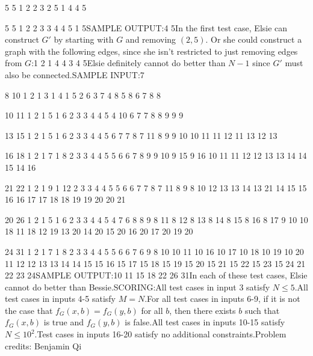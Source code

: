 \documentclass[12pt]{article}
\begin{document}
5 5
1 2
2 3
2 5
1 4
4 5

5 5
1 2
2 3
3 4
4 5
1 5SAMPLE OUTPUT:4
5In the first test case, Elsie can construct $G'$ by starting with $G$ and
removing  $(2,5)$. Or she could construct a graph with the following edges,
since she isn't restricted to just removing edges from $G$:1 2
1 4
4 3
4 5Elsie definitely cannot do better than $N-1$ since $G'$ must also be connected.SAMPLE INPUT:7

8 10
1 2
1 3
1 4
1 5
2 6
3 7
4 8
5 8
6 7
8 8

10 11
1 2
1 5
1 6
2 3
3 4
4 5
4 10
6 7
7 8
8 9
9 9

13 15
1 2
1 5
1 6
2 3
3 4
4 5
6 7
7 8
7 11
8 9
9 10
10 11
11 12
11 13
12 13

16 18
1 2
1 7
1 8
2 3
3 4
4 5
5 6
6 7
8 9
9 10
9 15
9 16
10 11
11 12
12 13
13 14
14 15
14 16

21 22
1 2
1 9
1 12
2 3
3 4
4 5
5 6
6 7
7 8
7 11
8 9
8 10
12 13
13 14
13 21
14 15
15 16
16 17
17 18
18 19
19 20
20 21

20 26
1 2
1 5
1 6
2 3
3 4
4 5
4 7
6 8
8 9
8 11
8 12
8 13
8 14
8 15
8 16
8 17
9 10
10 18
11 18
12 19
13 20
14 20
15 20
16 20
17 20
19 20

24 31
1 2
1 7
1 8
2 3
3 4
4 5
5 6
6 7
6 9
8 10
10 11
10 16
10 17
10 18
10 19
10 20
11 12
12 13
13 14
14 15
15 16
15 17
15 18
15 19
15 20
15 21
15 22
15 23
15 24
21 22
23 24SAMPLE OUTPUT:10
11
15
18
22
26
31In each of these test cases, Elsie cannot do better than Bessie.SCORING:All test cases in input 3 satisfy $N\le 5$.All test cases in inputs 4-5 satisfy $M=N$.For all test cases in inputs 6-9, if it is not the case that
$f_G(x,b)=f_G(y,b)$ for all $b$, then there exists $b$ such that $f_G(x,b)$ is
true and $f_G(y,b)$ is false.All test cases in inputs 10-15 satisfy $N\le 10^2$.Test cases in inputs 16-20 satisfy no additional constraints.Problem credits: Benjamin Qi
\end{document}
